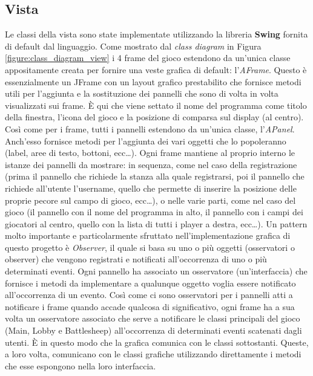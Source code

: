 \subsection{Vista}

Le classi della vista sono state implementate utilizzando la libreria
\textbf{Swing} fornita di default dal linguaggio.\newline
Come mostrato dal \textit{class diagram} in Figura
\ref{figure:class_diagram_view} i 4 frame del gioco estendono da un'unica
classe appositamente creata per fornire una veste grafica di default:
l'\textit{AFrame}. Questo è essenzialmente un JFrame con un layout grafico
prestabilito che fornisce metodi utili per l'aggiunta e la sostituzione dei
pannelli che sono di volta in volta visualizzati sui frame. È qui che viene
settato il nome del programma come titolo della finestra, l'icona del gioco e la
posizione di comparsa sul display (al centro).\newline
Così come per i frame, tutti i pannelli estendono da un'unica classe,
l'\textit{APanel}. Anch'esso fornisce metodi per l'aggiunta dei vari oggetti che
lo popoleranno (label, aree di testo, bottoni, ecc\dots). Ogni frame mantiene al
proprio interno le istanze dei pannelli da mostrare: in sequenza, come nel caso
della registrazione (prima il pannello che richiede la stanza alla quale
registrarsi, poi il pannello che richiede all'utente l'username, quello che
permette di inserire la posizione delle proprie pecore sul campo di gioco,
ecc\dots), o nelle varie parti, come nel caso del gioco (il pannello con il nome
del programma in alto, il pannello con i campi dei giocatori al centro, quello
con la lista di tutti i player a destra, ecc\dots).\newline
Un pattern molto importante e particolarmente sfruttato nell'implementazione
grafica di questo progetto è \textit{Observer}, il quale si basa su uno o più
oggetti (osservatori o observer) che vengono registrati e notificati
all'occorrenza di uno o più determinati eventi. Ogni pannello ha associato un
osservatore (un'interfaccia) che fornisce i metodi da implementare a qualunque
oggetto voglia essere notificato all'occorrenza di un evento. Così come ci sono
osservatori per i pannelli atti a notificare i frame quando accade qualcosa di
significativo, ogni frame ha a sua volta un osservatore associato che serve a
notificare le classi principali del gioco (Main, Lobby e Battlesheep)
all'occorrenza di determinati eventi scatenati dagli utenti. È in questo modo
che la grafica comunica con le classi sottostanti. Queste, a loro volta,
comunicano con le classi grafiche utilizzando direttamente i metodi che esse
espongono nella loro interfaccia.



